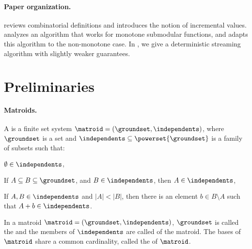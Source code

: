 \documentclass[oneside,letterpaper]{scrartcl} \usepackage{macros}
\begin{document}
\paragraph{Paper organization.}  reviews
combinatorial definitions and introduces the notion of incremental
values.  analyzes an algorithm that works
for monotone submodular functions, and
 adapts this algorithm to the
non-monotone case. In , we give
a deterministic streaming algorithm with slightly weaker guarantees.

\section{Preliminaries}










\paragraph{Matroids.}
A  is a finite set system $\matroid =
(\groundset,\independents)$, where $\groundset$ is a set and
$\independents \subseteq \powerset{\groundset}$ is a family of subsets
such that:\begin{inline_properties}
\item $\emptyset \in \independents$,
\item If $A \subseteq B \subseteq \groundset$, and $B \in
  \independents$, then $A \in \independents$,
\item If $A, B \in \independents$ and $|A| < |B|$, then there is an
  element $b \in B \setminus A$ such that $A + b \in \independents$.
\end{inline_properties}
In a matroid $\matroid = (\groundset,\independents)$, $\groundset$ is
called the  and the members of $\independents$ are
called  of the matroid. The bases of
$\matroid$ share a common cardinality, called the  of
$\matroid$.
\end{document}

